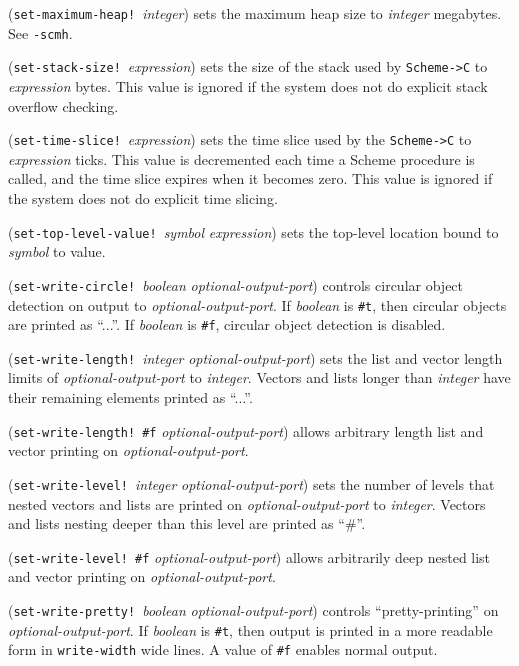 \documentclass[10pt,twocolumn]{article}
\begin{document}
(\texttt{set-maximum-heap!}\ \emph{integer}) sets the maximum heap size to
\emph{integer} megabytes.  See \texttt{-scmh}.

(\texttt{set-stack-size!}\ \emph{expression}) sets the size of the stack used
by \texttt{Scheme->C} to \emph{expression} bytes.  This value is ignored if the
system does not do explicit stack overflow checking.

(\texttt{set-time-slice!}\ \emph{expression}) sets the time slice used by the
\texttt{Scheme->C} to \emph{expression} ticks. This value is decremented each
time a Scheme procedure is called, and the time slice expires when it
becomes zero.  This value is ignored if the system does not do
explicit time slicing.

(\texttt{set-top-level-value!}\ \emph{symbol} \emph{expression}) sets the
top-level location bound to \emph{symbol} to value.

(\texttt{set-write-circle!}\ \emph{boolean} \emph{optional-output-port})
controls circular object detection on output to
\emph{optional-output-port}. If \emph{boolean} is \texttt{\#t}, then
circular objects are printed as ``...''.  If \emph{boolean} is
\texttt{\#f}, circular object detection is disabled.

(\texttt{set-write-length!}\ \emph{integer} \emph{optional-output-port})
sets the list and vector length limits of \emph{optional-output-port} to
\emph{integer}.  Vectors and lists longer than \emph{integer} have their
remaining elements printed as ``...''.

(\texttt{set-write-length!}\ \texttt{\#f} \emph{optional-output-port}) allows
arbitrary length list and vector printing on \emph{optional-output-port}.

(\texttt{set-write-level!}\ \emph{integer} \emph{optional-output-port})
sets the number of levels that nested vectors and lists are
printed on \emph{optional-output-port} to \emph{integer}.  Vectors
and lists nesting deeper than this level are printed as ``\#''.

(\texttt{set-write-level!}\ \texttt{\#f} \emph{optional-output-port}) allows
arbitrarily deep nested list and vector printing on \emph{optional-output-port}.

(\texttt{set-write-pretty!}\ \emph{boolean} \emph{optional-output-port})
controls ``pretty-printing'' on \emph{optional-output-port}.  If
\emph{boolean} is \texttt{\#t}, then output is printed in a more readable form in
\texttt{write-width} wide lines.  A value of \texttt{\#f} enables normal
output.
\end{document}
